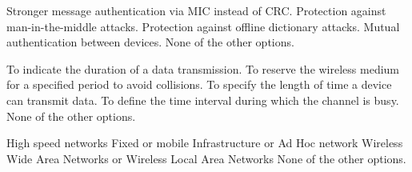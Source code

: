 \begin{checkboxes}
    \choice Stronger message authentication via MIC instead of CRC.
    \CorrectChoice Protection against man-in-the-middle attacks.
    \CorrectChoice Protection against offline dictionary attacks.
    \CorrectChoice Mutual authentication between devices.
    \choice None of the other options.
\end{checkboxes}

\begin{checkboxes}
    \choice To indicate the duration of a data transmission.
    \CorrectChoice To reserve the wireless medium for a specified period to avoid collisions.
    \choice To specify the length of time a device can transmit data.
    \choice To define the time interval during which the channel is busy.
    \choice None of the other options.
\end{checkboxes}

\begin{checkboxes}
    \choice High speed networks
    \CorrectChoice Fixed or mobile
    \CorrectChoice Infrastructure or Ad Hoc network
    \CorrectChoice Wireless Wide Area Networks or Wireless Local Area Networks
    \choice None of the other options.
\end{checkboxes}
